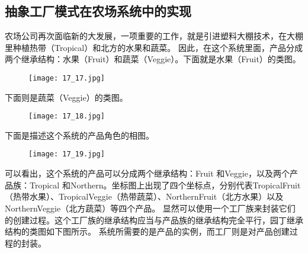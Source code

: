 \documentclass[../main.tex]{subfiles}
\begin{document}
\subsection{抽象工厂模式在农场系统中的实现}
农场公司再次面临新的大发展，一项重要的工作，就是引进塑料大棚技术，在大棚里种植热带（Tropical）和北方的水果和蔬菜。
因此，在这个系统里面，产品分成两个继承结构：水果（Fruit）和蔬菜（Veggie）。下面就是水果（Fruit）的类图。
\begin{figure}[H]
  \texttt{[image: 17\_17.jpg]}
\end{figure}
%
下面则是蔬菜（Veggie）的类图。
\begin{figure}[H]
  \texttt{[image: 17\_18.jpg]}
\end{figure}
%
下面是描述这个系统的产品角色的相图。
\begin{figure}[H]
  \texttt{[image: 17\_19.jpg]}
\end{figure}
%
可以看出，这个系统的产品可以分成两个继承结构：Fruit 和Veggie，以及两个产品族：Tropical 和Northern。坐标图上出现了四个坐标点，分别代表TropicalFruit（热带水果）、TropicalVeggie（热带蔬菜）、NorthernFruit（北方水果）以及NorthernVeggie（北方蔬菜）等四个产品。
显然可以使用一个工厂族来封装它们的创建过程。这个工厂族的继承结构应当与产品族的继承结构完全平行，园丁继承结构的类图如下图所示。
系统所需要的是产品的实例，而工厂则是对产品创建过程的封装。
\end{document}
